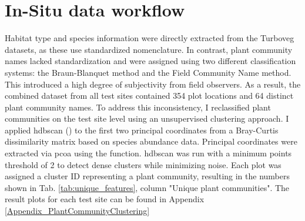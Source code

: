 \section{In-Situ data workflow}
Habitat type and species information were directly extracted from the Turboveg datasets, as these use standardized nomenclature. In contrast, plant community names lacked standardization and were assigned using two different classification systems: the Braun-Blanquet method and the Field Community Name method. This introduced a high degree of subjectivity from field observers. As a result, the combined dataset from all test sites contained 354 plot locations and 64 distinct plant community names. To address this inconsistency, I reclassified plant communities on the test site level using an unsupervised clustering approach. I applied \ac{hdbscan} (\cite{noauthor_how_nodate}) to the first two principal coordinates from a Bray-Curtis dissimilarity matrix based on species abundance data. Principal coordinates were extracted via \ac{pcoa} using the  function. \ac{hdbscan} was run with a minimum points threshold of 2 to detect dense clusters while minimizing noise. Each plot was assigned a cluster ID representing a plant community, resulting in the numbers shown in Tab. \ref{tab:unique_features}, column "Unique plant communities". The result plots for each test site can be found in Appendix \ref{Appendix_PlantCommunityClustering}

\begin{table}[htbp]
\centering
\caption{Summary of unique biological and spectral features observed at each test site.}
\label{tab:unique_features}
\end{table}



